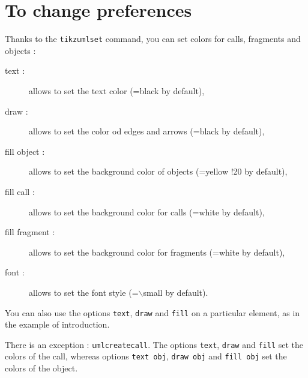 \documentclass[a4paper,11pt]{report}
\newcommand{\inputTikZ}[1]{%
  }%
\newcommand{\inputTikZ}[1]{%
    \texttt{[image: fig/\#1.pdf]}%
  }%
\begin{document}
\medskip

\begin{minipage}{0.5\textwidth}

\end{minipage}
\begin{minipage}{0.5\textwidth}
\begin{center}
\inputTikZ{fragmentpart}
\end{center}
\end{minipage}

\section{To change preferences}\label{s.fitseq}

Thanks to the {\tt tikzumlset} command, you can set colors for calls, fragments and objects :

\begin{description}
\item[text :] allows to set the text color (=black by default),
\item[draw :] allows to set the color od edges and arrows (=black by default),
\item[fill object :] allows to set the background color of objects (=yellow !20 by default),
\item[fill call :] allows to set the background color for calls (=white by default),
\item[fill fragment :] allows to set the background color for fragments (=white by default),
\item[font :] allows to set the font style (=$\backslash$small by default).
\end{description}

You can also use the options {\tt text}, {\tt draw} and {\tt fill} on a particular element, as in the example of introduction.

There is an exception : {\tt umlcreatecall}. The options {\tt text}, {\tt draw} and {\tt fill} set the colors of the call, whereas options {\tt text obj}, {\tt draw obj} and {\tt fill obj} set the colors of the object.

\medskip

\begin{minipage}{0.6\textwidth}

\end{minipage}
\begin{minipage}{0.4\textwidth}
\begin{center}
\inputTikZ{createcallset}
\end{center}
\end{minipage}
\end{document}
